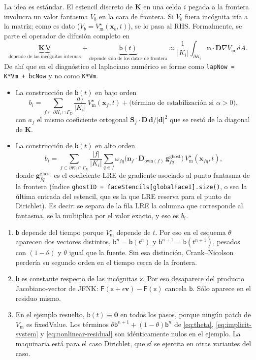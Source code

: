 \documentclass[11pt,a4paper]{article}
\newcommand{\code}[1]{\texttt{\small #1}}
\newcommand{\Vm}{V_{\text{m}}}
\newcommand{\Dten}{\mathbf{D}}
\newcommand{\grad}{\nabla}
\newcommand{\Kstif}{\mathbf{K}}
\newcommand{\Fres}{\mathsf{F}}
\begin{document}
La idea es estándar. El estencil discreto de $\Kstif$ en una celda $i$ pegada a la frontera involucra un valor fantasma $V_b$ en la cara de frontera. Si $V_b$ fuera incógnita iría a la matriz; como es dato ($V_b=\Vm^\star(\mathbf{x}_b,t)$), se lo pasa al RHS. Formalmente, se parte el operador de difusión completo en
$$
\underbrace{\Kstif\,\mathsf{V}}_{\text{depende de las incógnitas internas}} +\underbrace{\mathsf{b}(t)}_{\text{depende sólo de los datos de frontera}} \approx \frac{1}{|K_i|}\int_{\partial K_i}\mathbf{n}\cdot\Dten\grad\Vm\,dA .
$$
De ahí que en el diagnóstico el laplaciano numérico se forme como \code{lapNow = K*Vm + bcNow} y no como \code{K*Vm}.

\begin{itemize}
\item La construcción de $\mathsf{b}(t)$ en bajo orden
$$
b_i = \sum_{f\subset\partial K_i\cap\Gamma_D}\frac{a_f}{|K_i|}\,\Vm^\star(\mathbf{x}_f,t)+\text{(término de estabilización si }\alpha>0),
$$
con $a_f$ el mismo coeficiente ortogonal $\mathbf{S}_f\cdot\Dten\,\mathbf{d}/|\mathbf{d}|^2$ que se restó de la diagonal de $\Kstif$.
\item  La construcción de $\mathsf{b}(t)$ en alto orden
$$
b_i = \sum_{f\subset\partial K_i\cap\Gamma_D}\frac{|f|}{|K_i|}\sum_{q\in f}\omega_{fq}\Big(\mathbf{n}_f\cdot\Dten_{\mathrm{own}(f)}\,\mathbf{g}^{\text{ghost}}_{fq}\Big)\,\Vm^\star(\mathbf{x}_{fq},t),
$$
donde $\mathbf{g}^{\text{ghost}}_{fq}$ es el coeficiente LRE de gradiente asociado al punto fantasma de la frontera (índice \code{ghostID = faceStencils[globalFaceI].size()}, o sea la última entrada del estencil, que es la que LRE reserva para el punto de Dirichlet). Es decir: se separa de la fila LRE la columna que corresponde al fantasma, se la multiplica por el valor exacto, y eso es $b_i$.
\end{itemize}

\begin{enumerate}
\item $\mathsf{b}$ depende del tiempo porque $\Vm^\star$ depende de $t$. Por eso en el esquema $\theta$ aparecen dos vectores distintos, $\mathsf{b}^n=\mathsf{b}(t^n)$ y $\mathsf{b}^{n+1}=\mathsf{b}(t^{n+1})$, pesados con $(1-\theta)$ y $\theta$ igual que la fuente. Sin esa distinción, Crank–Nicolson perdería su segundo orden en el tiempo cerca de la frontera.
\item $\mathsf{b}$ es constante respecto de las incógnitas $\mathsf{x}$. Por eso desaparece del producto Jacobiano-vector de JFNK: $\Fres(\mathsf{x}+\epsilon\mathbf{v})-\Fres(\mathsf{x})$ cancela $\mathsf{b}$. Sólo aparece en el residuo mismo.
\item En el ejemplo resuelto, $\mathsf{b}(t)\equiv\mathbf{0}$ en todos los pasos, porque ningún patch de $V_\text{m}$ es fixedValue. Los términos $\theta\mathsf{b}^{n+1}+(1-\theta)\mathsf{b}^{n}$ de \eqref{eq:theta}, \eqref{eq:implicit-system} y \eqref{eq:nonlinear-residual} son idénticamente nulos en el ejemplo. La maquinaria está para el caso Dirichlet, que sí se ejercita en otras variantes del caso.
\end{enumerate}
\end{document}
